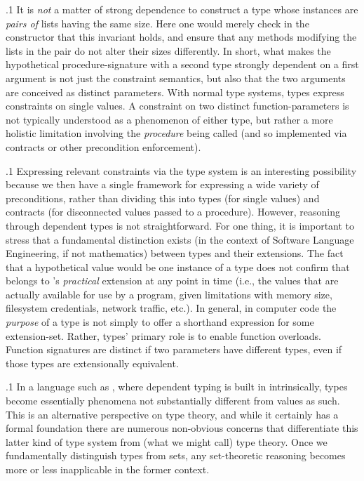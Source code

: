 \documentclass[11pt, twocolumn]{article}
\begin{document}
\p.1{%
It is \textit{not} a matter of strong dependence
to construct a type whose instances are \textit{pairs of}
lists having the same size. Here one would merely
check in the constructor that this invariant
holds, and ensure that any methods modifying
the lists in the pair do not alter their sizes
differently. In short, what makes the hypothetical
procedure-signature with a second type strongly dependent
on a first argument is not just the constraint
semantics, but also that the two arguments
are conceived as distinct parameters. With normal
type systems, types express constraints on single
values. A constraint on two distinct function-parameters
is not typically understood as a phenomenon of
either type, but rather a more holistic limitation
involving the \textit{procedure} being called (and so
implemented via contracts or other precondition enforcement).
}%

\p.1{%
Expressing relevant constraints via  the type
system is an interesting possibility because we then
have a single framework for expressing a wide variety
of preconditions, rather than dividing this into
types (for single values) and contracts
(for disconnected values passed to a procedure).
However, reasoning through dependent types
is not straightforward. For one thing,
it is important to stress that a fundamental
distinction exists (in the context of Software Language
Engineering, if not mathematics) between
types and their extensions. The fact that a hypothetical
value  would be one instance of a type 
does not confirm that  belongs to
's \textit{practical} extension at any point
in time (i.e., the values that are actually
available for use by a program, given limitations
with memory size, filesystem credentials, network
traffic, etc.). In general, in computer
code the \textit{purpose} of a type is not
simply to offer a shorthand expression for
some extension-set. Rather, types'
primary role is to enable function overloads.
Function signatures are distinct if two parameters
have different types, even if those types
are extensionally equivalent.
}%

\p.1{%
In a language such as , where dependent
typing is built in intrinsically, types
become essentially  phenomena
not substantially different from values as such.
This is an alternative perspective on type
theory, and while it certainly has a formal
foundation there are numerous non-obvious
concerns that differentiate this latter
kind of type system from (what we might call)
 type theory. Once
we fundamentally distinguish types from sets,
any set-theoretic reasoning becomes
more or less inapplicable in the former context.
}%
\end{document}
